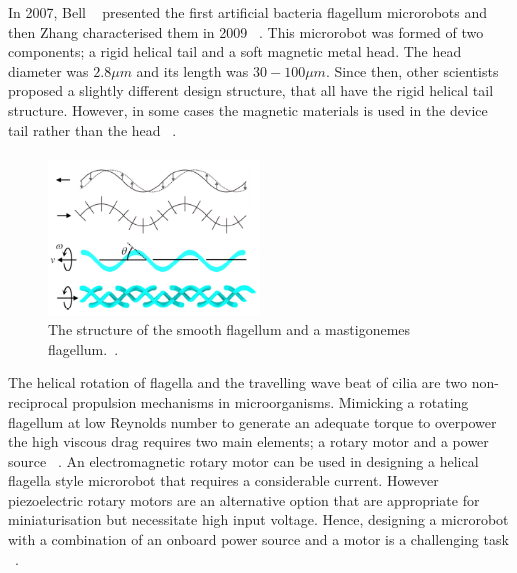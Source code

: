 \documentclass[12pt,a4paper,titlepage]{report}
\begin{document}
In 2007, Bell ~\citep{gao2013bioinspired} presented the first artificial bacteria flagellum microrobots and then
 Zhang characterised them in 2009 ~\citep{gao2013bioinspired}. This microrobot was formed of two 
components; a rigid helical tail and a soft magnetic metal head. The head diameter 
was $2.8 \mu  m$ and its length was $30-100 \mu m$. Since then, other scientists proposed a slightly different design 
structure, that all have the rigid helical tail structure. However, in some cases the magnetic
 materials is used in the device tail rather than the head ~\citep{gao2013bioinspired}. 
 
\paragraph{}

\begin{figure}
  \begin{center}
    \includegraphics[width=0.5\textwidth]{10}
  \caption{ The structure of the smooth flagellum and a mastigonemes flagellum.~\citep{gao2013bioinspired}.}
  \label{10}
\end{center}
\end{figure}

The helical rotation of flagella and the travelling wave beat of cilia are two non-reciprocal propulsion
 mechanisms in microorganisms. Mimicking a rotating flagellum at low Reynolds number to generate an 
adequate torque to overpower the high viscous drag requires two main elements; a rotary motor and a
 power source ~\citep{qiunanohelices}. 
An electromagnetic rotary motor can be used in designing a helical flagella style microrobot that 
requires a considerable current. However piezoelectric rotary motors are an alternative option 
that are appropriate for miniaturisation but necessitate high input voltage.  Hence, designing a microrobot with a 
combination of an onboard power source and a motor is a challenging task ~\citep{qiunanohelices}.
\end{document}
